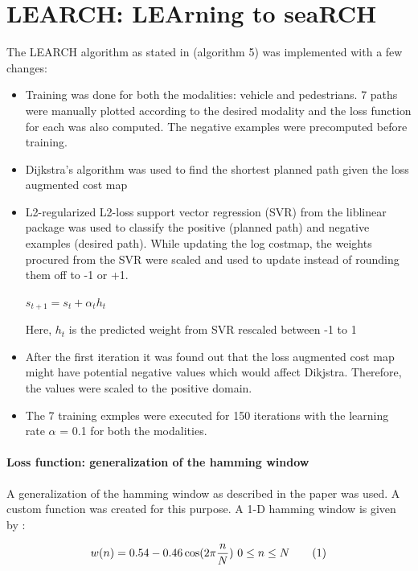 \documentclass[english]{article}
\newcommand\numberthis{\addtocounter{equation}{1}\tag{\theequation}}
\begin{document}
\section{LEARCH: LEArning to seaRCH}
The LEARCH algorithm as stated in \cite{c1} (algorithm 5) was implemented with a few changes: \\
\begin{itemize}
\item Training was done for both the modalities: vehicle and pedestrians. 7 paths were manually plotted according to the desired modality and the loss function for each was also computed. The negative examples were precomputed before training. 

\item Dijkstra's algorithm was used to find the shortest planned path given the loss augmented cost map

\item L2-regularized L2-loss support vector regression (SVR) from the liblinear package \cite{c2} was used to classify the positive (planned path) and negative examples (desired path). While updating the log costmap, the weights procured from the SVR were scaled and used to update instead of rounding them off to -1 or +1.
\begin{center}
$s_{t+1} = s_{t} + \alpha_t h_t$ 
\end{center}
Here, $h_t$ is the predicted weight from SVR rescaled between -1 to 1 

\item After the first iteration it was found out that the loss augmented cost map might have potential negative values which would affect Dikjstra. Therefore, the values were scaled to the positive domain. 

\item The 7 training exmples were executed for 150 iterations with the learning rate $\alpha$ = 0.1 for both the modalities. 

\end{itemize}

\paragraph{Loss function: generalization of the hamming window}
A generalization of the hamming window as described in the paper was used. A custom function was created for this purpose. A 1-D hamming window is given by :

\begin{align*}
w(n) = 0.54 - 0.46 \cos (2\pi \frac{n}{N}) \ 0 \leq n \leq N \numberthis
\end{align*}
\end{document}
